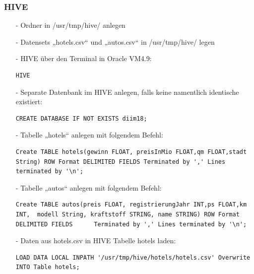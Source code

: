 \subsubsection*{HIVE}
\begin{itemize}
\item[-] Ordner in /usr/tmp/hive/ anlegen
\item[-] Datensets „hotels.csv“ und „autos.csv“  in /usr/tmp/hive/ legen
\item[-] HIVE über den Terminal in Oracle VM4.9:

\begin{lstlisting}
HIVE
\end{lstlisting}

\item[-] Separate Datenbank im HIVE anlegen, falls keine namentlich identische existiert:
\begin{lstlisting}
CREATE DATABASE IF NOT EXISTS diim18;
\end{lstlisting}

\item[-] Tabelle „hotels“ anlegen mit folgendem Befehl:
\begin{lstlisting}
Create TABLE hotels(gewinn FLOAT, preisInMio FLOAT,qm FLOAT,stadt String) ROW Format DELIMITED FIELDS Terminated by ',' Lines terminated by '\n';
\end{lstlisting}

\item[-] Tabelle „autos“ anlegen mit folgendem Befehl:
\begin{lstlisting}
Create TABLE autos(preis FLOAT, registrierungJahr INT,ps FLOAT,km INT,  modell String, kraftstoff STRING, name STRING) ROW Format DELIMITED FIELDS      Terminated by ',' Lines terminated by '\n';
\end{lstlisting}

\item[-] Daten aus hotels.csv in HIVE Tabelle hotels laden:
\begin{lstlisting}
LOAD DATA LOCAL INPATH '/usr/tmp/hive/hotels/hotels.csv' Overwrite INTO Table hotels;
\end{lstlisting}


\end{itemize}
